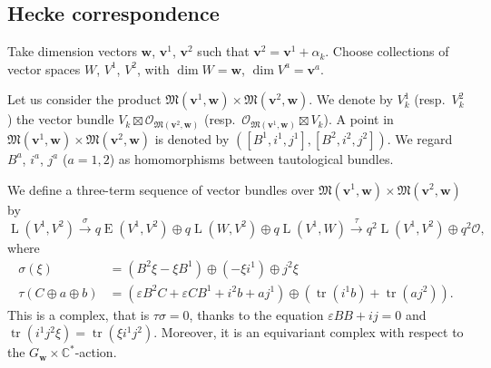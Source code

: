 \documentclass[12pt]{amsart}
\def\Bbb{\mathbb}
\def\frak{\mathfrak}
\theoremstyle{definition}
\theoremstyle{remark}
\numberwithin{equation}{subsection}
\newcommand{\C}{{\Bbb C}}
\newcommand{\tr}{\operatorname{tr}}
\newcommand{\M}{{\frak M}} %
\newcommand{\bv}{{\mathbf v}} %
\newcommand{\bw}{{\mathbf w}} %
\newcommand{\HomE}{\operatorname{E}}
\newcommand{\HomL}{\operatorname{L}}
\newcommand{\shfO}{\mathcal O}
\begin{document}
\subsection{Hecke correspondence}\label{subsec:hecke}

Take dimension vectors $\bw$, $\bv^1$, $\bv^2$ such that
$\bv^2 = \bv^1 + \alpha_k$.
Choose collections of vector spaces $W$, $V^1$, $V^2$, with
$\dim W = \bw$, $\dim V^a = \bv^a$.

Let us consider the product $\M(\bv^1,\bw)\times\M(\bv^2,\bw)$.
%
We denote by
$V^1_k$ (resp.\ $V^2_k$) the vector bundle
$V_k\boxtimes\shfO_{\M(\bv^2,\bw)}$
(resp.\ $\shfO_{\M(\bv^1,\bw)}\boxtimes V_k$).
A point in $\M(\bv^1,\bw)\times\M(\bv^2,\bw)$ is denoted by
$([B^1,i^1,j^1], [B^2, i^2, j^2])$.
%
We regard $B^a$, $i^a$, $j^a$ ($a=1,2$) as homomorphisms between
tautological bundles.

We define a three-term sequence of vector bundles
over $\M(\bv^1,\bw)\times \M(\bv^2, \bw)$ by
%
\begin{equation}\label{eq:hecke_complex}
  \HomL(V^1, V^2)
  \overset{\sigma}{\longrightarrow}
    q \HomE(V^1,V^2) \oplus 
    q \HomL(W, V^2) \oplus q \HomL(V^1,W)
  \overset{\tau}{\longrightarrow}
  q^2 \HomL(V^1, V^2) \oplus q^2\shfO,
\end{equation}
where
\begin{equation*}
\begin{split}
        \sigma(\xi) & = (B^2 \xi - \xi B^1) \oplus
         (-\xi i^1) \oplus j^2 \xi \\
        \tau(C\oplus a\oplus b)
         &= ( \varepsilon B^2 C + \varepsilon C B^1 + i^2 b + a j^1)
        \oplus\left( \tr(i^1 b) + \tr(a j^2)\right).
\end{split}\end{equation*}
This is a complex, that is $\tau\sigma = 0$, thanks to
the equation $\varepsilon BB+ij = 0$ and $\tr(i^1 j^2 \xi) = \tr(\xi
i^1 j^2)$.
Moreover, it is an equivariant complex with respect to the
$G_\bw\times\C^*$-action.
\end{document}
